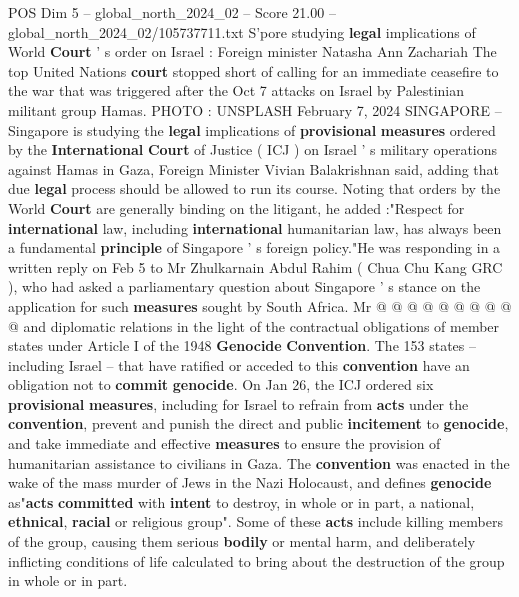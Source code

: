 \begin{textsample}{POS Dim 5 – global\_north\_2024\_02 – Score 21.00 – global\_north\_2024\_02/105737711.txt}  \label{ex:f5_pos_234}
S'pore studying \textbf{legal} implications of World \textbf{Court} ' s order on Israel : Foreign minister Natasha Ann Zachariah The top United Nations \textbf{court} stopped short of calling for an immediate ceasefire to the war that was triggered after the Oct 7 attacks on Israel by Palestinian militant group Hamas.
PHOTO : UNSPLASH February 7, 2024 SINGAPORE -- Singapore is studying the \textbf{legal} implications of \textbf{provisional} \textbf{measures} ordered by the \textbf{International} \textbf{Court} of Justice ( ICJ ) on Israel ' s military operations against Hamas in Gaza, Foreign Minister Vivian Balakrishnan said, adding that due \textbf{legal} process should be allowed to run its course.
Noting that orders by the World \textbf{Court} are generally binding on the litigant, he added :"Respect for \textbf{international} law, including \textbf{international} humanitarian law, has always been a fundamental \textbf{principle} of Singapore ' s foreign policy."He was responding in a written reply on Feb 5 to Mr Zhulkarnain Abdul Rahim ( Chua Chu Kang GRC ), who had asked a parliamentary question about Singapore ' s stance on the application for such \textbf{measures} sought by South Africa.
Mr @ @ @ @ @ @ @ @ @ @ and diplomatic relations in the light of the contractual obligations of member states under Article I of the 1948 \textbf{Genocide} \textbf{Convention}.
The 153 states -- including Israel -- that have ratified or acceded to this \textbf{convention} have an obligation not to \textbf{commit} \textbf{genocide}.
On Jan 26, the ICJ ordered six \textbf{provisional} \textbf{measures}, including for Israel to refrain from \textbf{acts} under the \textbf{convention}, prevent and punish the direct and public \textbf{incitement} to \textbf{genocide}, and take immediate and effective \textbf{measures} to ensure the provision of humanitarian assistance to civilians in Gaza.
The \textbf{convention} was enacted in the wake of the mass murder of Jews in the Nazi Holocaust, and defines \textbf{genocide} as"\textbf{acts} \textbf{committed} with \textbf{intent} to destroy, in whole or in part, a national, \textbf{ethnical}, \textbf{racial} or religious group".
Some of these \textbf{acts} include killing members of the group, causing them serious \textbf{bodily} or mental harm, and deliberately inflicting conditions of life calculated to bring about the destruction of the group in whole or in part.

\end{textsample}
